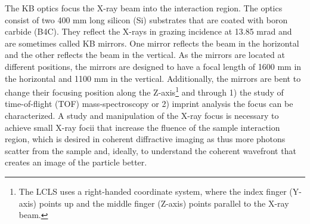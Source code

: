 The KB optics focus the X-ray beam into the interaction region. The optics consist of two 400 mm long silicon (Si) substrates that are coated with boron carbide (B4C). They reflect the X-rays in grazing incidence at 13.85 mrad and are sometimes called KB mirrors. One mirror reflects the beam in the horizontal and the other reflects the beam in the vertical. As the mirrors are located at different positions, the mirrors are designed to have a focal length of 1600 mm in the horizontal and 1100 mm in the vertical. Additionally, the mirrors are bent to change their focusing position along the Z-axis\footnote{The LCLS uses a right-handed coordinate system, where the index finger (Y-axis) points up and the middle finger (Z-axis) points parallel to the X-ray beam.} and through 1) the study of time-of-flight (TOF) mass-spectroscopy \citep{Bucher-2016-Unpublished} or 2) imprint analysis \citep{Hajkova-2011-SPIE,Chalupsky-2011-NIMPR} the focus can be characterized. A study and manipulation of the X-ray focus is necessary to achieve small X-ray focii that increase the fluence of the sample interaction region, which is desired in coherent diffractive imaging as thus more photons scatter from the sample and, ideally, to understand the coherent wavefront that creates an image of the particle better.
